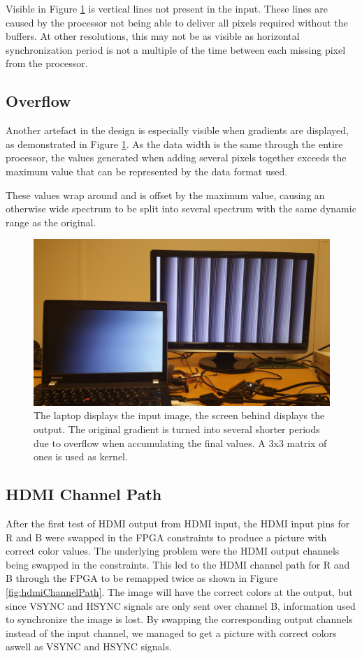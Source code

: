 Visible in Figure \ref{fig:Overflow} is vertical lines not present in the input.
These lines are caused by the processor not being able to deliver all pixels required without the buffers.
At other resolutions, this may not be as visible as horizontal synchronization period is not a multiple of the time between each missing pixel from the processor.

\subsection{Overflow}
Another artefact in the design is especially visible when gradients are displayed, as demonstrated in Figure \ref{fig:Overflow}.
As the data width is the same through the entire processor, the values generated when adding several pixels together exceeds the maximum value that can be represented by the data format used.

These values wrap around and is offset by the maximum value, causing an otherwise wide spectrum to be split into several spectrum with the same dynamic range as the original.

\begin{figure}
    \centering
    \includegraphics[width=14cm]{img/gradient_test}
    \caption{
        The laptop displays the input image, the screen behind displays the output.
        The original gradient is turned into several shorter periods due to overflow when accumulating the final values.
        A 3x3 matrix of ones is used as kernel.
    }
    \label{fig:Overflow}

\end{figure}

\subsection{HDMI Channel Path}
After the first test of HDMI output from HDMI input, the HDMI input pins for R and B were swapped in the FPGA constraints to produce a picture with correct color values. The underlying problem were the HDMI output channels being swapped in the constraints. This led to the HDMI channel path for R and B through the FPGA to be remapped twice as shown in Figure \ref{fig:hdmiChannelPath}. The image will have the correct colors at the output, but since VSYNC and HSYNC signals are only sent over channel B, information used to synchronize the image is lost. By swapping the corresponding output channels instead of the input channel, we managed to get a picture with correct colors aswell as VSYNC and HSYNC signals.

